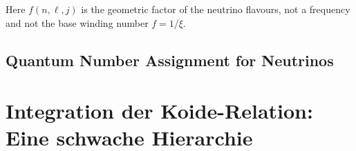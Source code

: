 Here $f(n,\ell,j)$ is the geometric factor of the neutrino flavours, not a frequency and not the base winding number $f = 1/\xi$.

	\subsection{Quantum Number Assignment for Neutrinos}
	
	\begin{table}[h]
		\centering
		\caption{Speculative T0 Quantum Numbers for Neutrino Flavors}
	\end{table}
	
	\section{Integration der Koide-Relation: Eine schwache Hierarchie}
	
